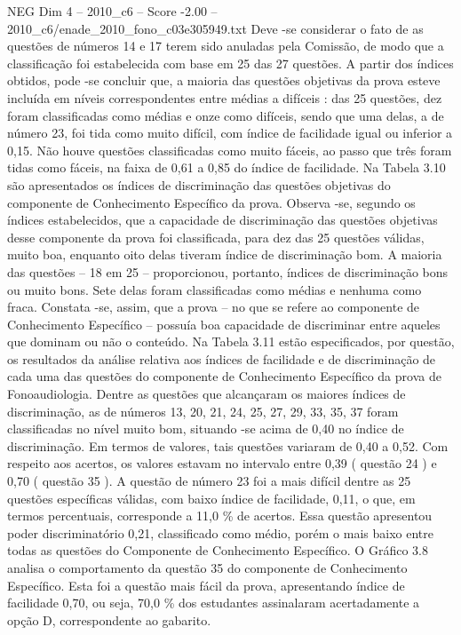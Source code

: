 \begin{textsample}{NEG Dim 4 – 2010\_c6 – Score -2.00 – 2010\_c6/enade\_2010\_fono\_c03e305949.txt}
Deve -se considerar o fato de as questões de números 14 e 17 terem sido anuladas pela Comissão, de modo que a classificação foi estabelecida com base em 25 das 27 questões.
A partir dos índices obtidos, pode -se concluir que, a maioria das questões objetivas da prova esteve incluída em níveis correspondentes entre médias a difíceis : das 25 questões, dez foram classificadas como médias e onze como difíceis, sendo que uma delas, a de número 23, foi tida como muito difícil, com índice de facilidade igual ou inferior a 0,15.
Não houve questões classificadas como muito fáceis, ao passo que três foram tidas como fáceis, na faixa de 0,61 a 0,85 do índice de facilidade.
Na Tabela 3.10 são apresentados os índices de discriminação das questões objetivas do componente de Conhecimento Específico da prova.
Observa -se, segundo os índices estabelecidos, que a capacidade de discriminação das questões objetivas desse componente da prova foi classificada, para dez das 25 questões válidas, muito boa, enquanto oito delas tiveram índice de discriminação bom.
A maioria das questões – 18 em 25 – proporcionou, portanto, índices de discriminação bons ou muito bons.
Sete delas foram classificadas como médias e nenhuma como fraca.
Constata -se, assim, que a prova – no que se refere ao componente de Conhecimento Específico – possuía boa capacidade de discriminar entre aqueles que dominam ou não o conteúdo.
Na Tabela 3.11 estão especificados, por questão, os resultados da análise relativa aos índices de facilidade e de discriminação de cada uma das questões do componente de Conhecimento Específico da prova de Fonoaudiologia.
Dentre as questões que alcançaram os maiores índices de discriminação, as de números 13, 20, 21, 24, 25, 27, 29, 33, 35, 37 foram classificadas no nível muito bom, situando -se acima de 0,40 no índice de discriminação.
Em termos de valores, tais questões variaram de 0,40 a 0,52.
Com respeito aos acertos, os valores estavam no intervalo entre 0,39 ( questão 24 ) e 0,70 ( questão 35 ).
A questão de número 23 foi a mais difícil dentre as 25 questões específicas válidas, com baixo índice de facilidade, 0,11, o que, em termos percentuais, corresponde a 11,0 \% de acertos.
Essa questão apresentou poder discriminatório 0,21, classificado como médio, porém o mais baixo entre todas as questões do Componente de Conhecimento Específico.
O Gráfico 3.8 analisa o comportamento da questão 35 do componente de Conhecimento Específico.
Esta foi a questão mais fácil da prova, apresentando índice de facilidade 0,70, ou seja, 70,0 \% dos estudantes assinalaram acertadamente a opção D, correspondente ao gabarito.

\end{textsample}
